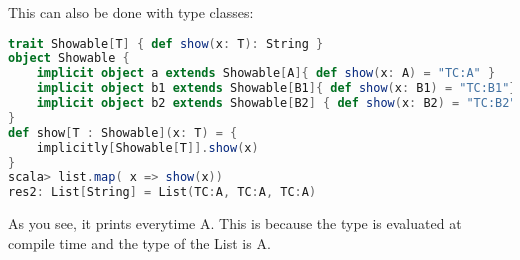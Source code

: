 This can also be done with type classes:

\begin{lstlisting}[language=scala,mathescape=false]
trait Showable[T] { def show(x: T): String }
object Showable {
    implicit object a extends Showable[A]{ def show(x: A) = "TC:A" }
    implicit object b1 extends Showable[B1]{ def show(x: B1) = "TC:B1"}
    implicit object b2 extends Showable[B2] { def show(x: B2) = "TC:B2" }
}
def show[T : Showable](x: T) = {
    implicitly[Showable[T]].show(x)
}
scala> list.map( x => show(x))
res2: List[String] = List(TC:A, TC:A, TC:A)
\end{lstlisting}

As you see, it prints everytime A. This is because the type is evaluated
at compile time and the type of the List is A.

\clearpage